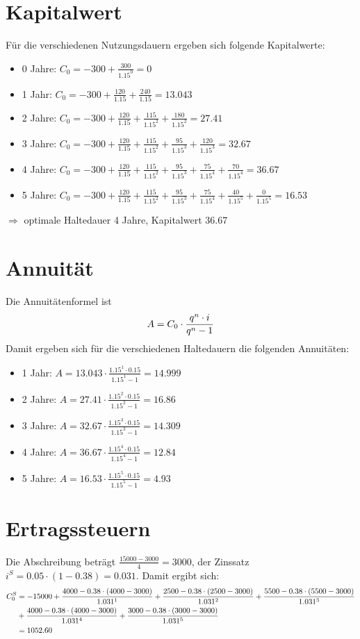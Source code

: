 \documentclass{article}
\begin{document}
	\section*{Kapitalwert}
	Für die verschiedenen Nutzungsdauern ergeben sich folgende Kapitalwerte:
	\begin{itemize}
		\item 0 Jahre: $C_0 = -300 + \frac{300}{1.15^0} = 0$ 
		\item 1 Jahr: $C_0 = -300 + \frac{120}{1.15} + \frac{240}{1.15} = 13.043$
		\item 2 Jahre: $C_0 = -300 + \frac{120}{1.15} + \frac{115}{1.15^2} + \frac{180}{1.15^2} = 27.41$
		\item 3 Jahre: $C_0 = -300 + \frac{120}{1.15} + \frac{115}{1.15^2} + \frac{95}{1.15^3} + \frac{120}{1.15^3} = 32.67$
		\item 4 Jahre: $C_0 = -300 + \frac{120}{1.15} + \frac{115}{1.15^2} + \frac{95}{1.15^3} + \frac{75}{1.15^4} + \frac{70}{1.15^4} = 36.67$
		\item 5 Jahre: $C_0 = -300 + \frac{120}{1.15} + \frac{115}{1.15^2} + \frac{95}{1.15^3} + \frac{75}{1.15^4} + \frac{40}{1.15^5} + \frac{0}{1.15^5} = 16.53$
	\end{itemize}
	$\Rightarrow$ optimale Haltedauer 4 Jahre, Kapitalwert 36.67
	
	\section*{Annuität}
	Die Annuitätenformel ist
	\begin{align}
		A = C_0\cdot\frac{q^n\cdot i}{q^n-1} \notag
	\end{align}
	Damit ergeben sich für die verschiedenen Haltedauern die folgenden Annuitäten:
	\begin{itemize}
		\item 1 Jahr: $A = 13.043 \cdot \frac{1.15^1\cdot 0.15}{1.15^1 - 1} = 14.999$
		\item 2 Jahre: $A = 27.41 \cdot \frac{1.15^2\cdot 0.15}{1.15^2 - 1} = 16.86$
		\item 3 Jahre: $A = 32.67 \cdot \frac{1.15^3\cdot 0.15}{1.15^3 - 1} = 14.309$
		\item 4 Jahre: $A = 36.67 \cdot \frac{1.15^4\cdot 0.15}{1.15^4 - 1} = 12.84$
		\item 5 Jahre: $A = 16.53 \cdot \frac{1.15^5\cdot 0.15}{1.15^5 - 1} = 4.93$
	\end{itemize}
	
	\section*{Ertragssteuern}
	Die Abschreibung beträgt $\frac{15000 - 3000}{4} = 3000$, der Zinssatz $i^S = 0.05\cdot (1-0.38) = 0.031$. Damit ergibt sich:
	\begin{align}
		C_0^S &= -15000 + \frac{4000 - 0.38\cdot (4000 - 3000)}{1.031^1} + \frac{2500 - 0.38\cdot (2500 - 3000)}{1.031^2} + \frac{5500 - 0.38\cdot (5500 - 3000)}{1.031^3} \notag \\
		&+ \frac{4000 - 0.38\cdot (4000 - 3000)}{1.031^4} + \frac{3000 - 0.38\cdot (3000 - 3000)}{1.031^5} \notag \\
		&= 1052.60 \notag
	\end{align}
	
\end{document}
